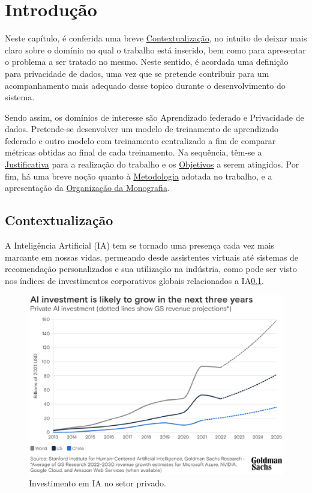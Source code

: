 \chapter*[Introdução]{Introdução}

Neste capítulo, é conferida uma breve \hyperref[sec:contextualizacao]{Contextualização}, no intuito de deixar mais claro sobre o domínio no qual o trabalho está inserido, bem como para apresentar o problema a ser tratado no mesmo. Neste sentido, é acordada uma definição para privacidade de dados, uma vez que se pretende contribuir para um acompanhamento mais adequado desse topico durante o desenvolvimento do sistema. 

Sendo assim, os domínios de interesse são Aprendizado federado e Privacidade de dados. Pretende-se desenvolver um modelo de treinamento de aprendizado federado e outro modelo com treinamento centralizado a fim de comparar métricas obtidas ao final de cada treinamento. Na sequência, têm-se a \hyperref[sec:justificativa]{Justificativa} para a realização do trabalho e os \hyperref[sec:objetivos]{Objetivos} a serem atingidos. Por fim, há uma breve noção quanto à \hyperref[sec:metodologia]{Metodologia} adotada no trabalho, e a apresentação da \hyperref[sec:organizacao]{Organização da Monografia}.

\section{Contextualização}
\label{sec:contextualizacao}

A Inteligência Artificial (IA) tem se tornado uma presença cada vez mais marcante em nossas vidas, permeando desde assistentes virtuais até sistemas de recomendação personalizados e sua utilização na indústria, como pode ser visto nos índices de investimentos corporativos globais relacionados a IA\ref{fig:investimentoIA}.

\begin{figure}[h]
    \centering
    \includegraphics[scale=0.6]{figuras/AIInvestiments2025.eps}
    \caption{Investimento em IA no setor privado.}
    \label{fig:investimentoIA}
\end{figure}

